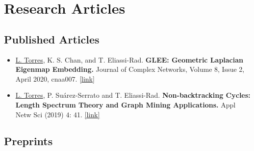 \documentclass[12pt,]{scrartcl}
\date{}
\newenvironment{myitemize}
{ \begin{itemize}
    \setlength{\itemsep}{5pt}
    \setlength{\parskip}{0pt}
    \setlength{\parsep}{0pt}     }
{ \end{itemize}                  }
\begin{document}
\section{Research Articles}\label{publications}

\subsection{Published Articles}\label{articles}

\begin{myitemize}
\leftskip-0.25in %

\item \underline{L. Torres}, K. S. Chan, and T. Eliassi-Rad. \textbf{GLEE: Geometric Laplacian Eigenmap Embedding.} Journal of Complex Networks, Volume 8, Issue 2, April 2020, cnaa007. \href{https://academic.oup.com/comnet/article/8/2/cnaa007/5775302?guestAccessKey=a6a1e399-bc7d-48db-82ad-5a3beabd81bf}{[link]}

\item \underline{L. Torres}, P. Su\'arez-Serrato and T. Eliassi-Rad.  \textbf{Non-backtracking Cycles: Length Spectrum Theory and Graph Mining Applications.}  Appl Netw Sci (2019) 4: 41. \href{https://doi.org/10.1007/s41109-019-0147-y}{[link]}

\end{myitemize}


\subsection{Preprints}\label{preprints}
\end{document}
